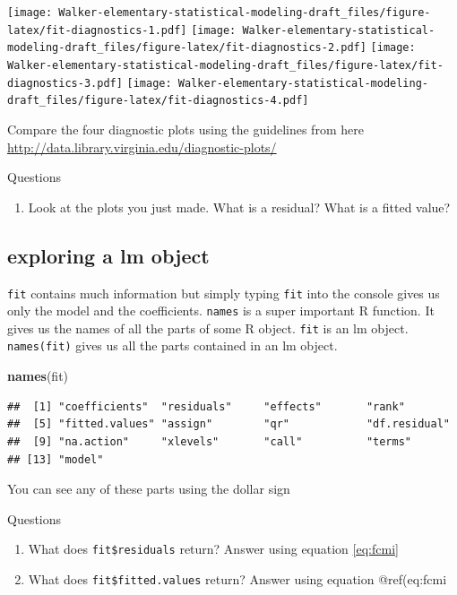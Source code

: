 \documentclass[]{book}
\newenvironment{Shaded}{\begin{snugshade}}{\end{snugshade}}
\newcommand{\KeywordTok}[1]{\textcolor[rgb]{0.13,0.29,0.53}{\textbf{#1}}}
\newcommand{\NormalTok}[1]{#1}
\providecommand{\tightlist}{%
  \setlength{\itemsep}{0pt}\setlength{\parskip}{0pt}}
\begin{document}
\texttt{[image: Walker-elementary-statistical-modeling-draft\_files/figure-latex/fit-diagnostics-1.pdf]}
\texttt{[image: Walker-elementary-statistical-modeling-draft\_files/figure-latex/fit-diagnostics-2.pdf]}
\texttt{[image: Walker-elementary-statistical-modeling-draft\_files/figure-latex/fit-diagnostics-3.pdf]}
\texttt{[image: Walker-elementary-statistical-modeling-draft\_files/figure-latex/fit-diagnostics-4.pdf]}

Compare the four diagnostic plots using the guidelines from here
\url{http://data.library.virginia.edu/diagnostic-plots/}

Questions

\begin{enumerate}
\def\labelenumi{\arabic{enumi}.}
\setcounter{enumi}{5}
\tightlist
\item
  Look at the plots you just made. What is a residual? What is a fitted
  value?
\end{enumerate}

\subsection{exploring a lm object}\label{exploring-a-lm-object}

\texttt{fit} contains much information but simply typing \texttt{fit}
into the console gives us only the model and the coefficients.
\texttt{names} is a super important R function. It gives us the names of
all the parts of some R object. \texttt{fit} is an lm object.
\texttt{names(fit)} gives us all the parts contained in an lm object.

\begin{Shaded}
\begin{Highlighting}[]
\KeywordTok{names}\NormalTok{(fit)}
\end{Highlighting}
\end{Shaded}

\begin{verbatim}
##  [1] "coefficients"  "residuals"     "effects"       "rank"         
##  [5] "fitted.values" "assign"        "qr"            "df.residual"  
##  [9] "na.action"     "xlevels"       "call"          "terms"        
## [13] "model"
\end{verbatim}

You can see any of these parts using the dollar sign

Questions

\begin{enumerate}
\def\labelenumi{\arabic{enumi}.}
\setcounter{enumi}{6}
\item
  What does \texttt{fit\$residuals} return? Answer using equation
  \eqref{eq:fcmi}
\item
  What does \texttt{fit\$fitted.values} return? Answer using equation
  @ref(eq:fcmi
\end{enumerate}
\end{document}
